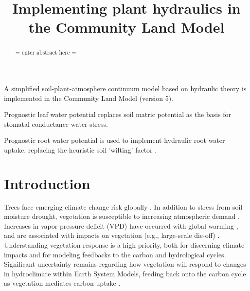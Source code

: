 \documentclass[draft,linenumbers]{agujournal}
\begin{document}
\title{Implementing plant hydraulics in the Community Land Model}



\begin{keypoints}
\item A simplified soil-plant-atmosphere continuum model based on hydraulic theory is implemented in the Community Land Model (version 5).
\item Prognostic leaf water potential replaces soil matric potential as the basis for stomatal conductance water stress. 
\item Prognostic root water potential is used to implement hydraulic root water uptake, replacing the heuristic soil 'wilting' factor .
\end{keypoints}



\begin{abstract}
= enter abstract here =
\end{abstract}


\section{Introduction}

Trees face emerging climate change risk globally \citep{allen2010,anderegg2013b}.
In addition to stress from soil moisture drought, vegetation is susceptible to increasing atmospheric demand \citep{restaino2016,novick2016b,lemordant2018}.
Increases in vapor pressure deficit (VPD) have occurred with global warming \citep{ficklin2017,seager2015}, and are associated with impacts on vegetation (e.g., large-scale die-off) \citep{williams2013,mcdowell2015}.
Understanding vegetation response is a high priority, both for discerning climate impacts and for modeling feedbacks to the carbon and hydrological cycles.
Significant uncertainty remains regarding how vegetation will respond to changes in hydroclimate within Earth System Models, feeding back onto the carbon cycle as vegetation mediates carbon uptake \citep{dekauwe2017,friedlingstein2014,trugman2018}.
\end{document}
